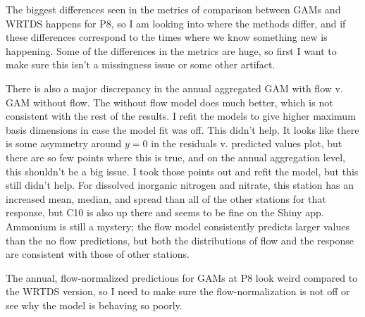 \documentclass[12pt]{amsart}
\begin{document}
The biggest differences seen in the metrics of comparison between GAMs and WRTDS happens for P8, so I am looking into where the methods differ, and if these differences correspond to the times where we know something new is happening. Some of the differences in the metrics are huge, so first I want to make sure this isn't a missingness issue or some other artifact. 

There is also a major discrepancy in the annual aggregated GAM with flow v. GAM without flow. The without flow model does much better, which is not consistent with the rest of the results. I refit the models to give higher maximum basis dimensions in case the model fit was off. This didn't help. It looks like there is some asymmetry around $y=0$ in the residuals v. predicted values plot, but there are so few points where this is true, and on the annual aggregation level, this shouldn't be a big issue. I took those points out and refit the model, but this still didn't help. For dissolved inorganic nitrogen and nitrate, this station has an increased mean, median, and spread than all of the other stations for that response, but C10 is also up there and seems to be fine on the Shiny app. Ammonium is still a mystery; the flow model consistently predicts larger values than the no flow predictions, but both the distributions of flow and the response are consistent with those of other stations.

The annual, flow-normalized predictions for GAMs at P8 look weird compared to the WRTDS version, so I need to make sure the flow-normalization is not off or see why the model is behaving so poorly.
\end{document}
